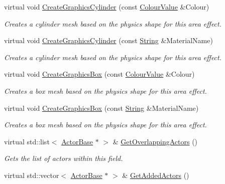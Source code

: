 \begin{DoxyCompactItemize}
virtual void \hyperlink{classphys_1_1AreaEffect_af9a44284ceb691fdd21e4fc01811f04d}{CreateGraphicsCylinder} (const \hyperlink{classphys_1_1ColourValue}{ColourValue} \&Colour)
\begin{DoxyCompactList}\small\item\em Creates a cylinder mesh based on the physics shape for this area effect. \item\end{DoxyCompactList}\item 
virtual void \hyperlink{classphys_1_1AreaEffect_a7ace0990c2e9282cfc91847fddeac3e0}{CreateGraphicsCylinder} (const \hyperlink{namespacephys_aa03900411993de7fbfec4789bc1d392e}{String} \&MaterialName)
\begin{DoxyCompactList}\small\item\em Creates a cylinder mesh based on the physics shape for this area effect. \item\end{DoxyCompactList}\item 
virtual void \hyperlink{classphys_1_1AreaEffect_a12655c60d5461ef6053c8bdd5cc9afea}{CreateGraphicsBox} (const \hyperlink{classphys_1_1ColourValue}{ColourValue} \&Colour)
\begin{DoxyCompactList}\small\item\em Creates a box mesh based on the physics shape for this area effect. \item\end{DoxyCompactList}\item 
virtual void \hyperlink{classphys_1_1AreaEffect_a169a8cba1c9aec84573788dff001fb31}{CreateGraphicsBox} (const \hyperlink{namespacephys_aa03900411993de7fbfec4789bc1d392e}{String} \&MaterialName)
\begin{DoxyCompactList}\small\item\em Creates a box mesh based on the physics shape for this area effect. \item\end{DoxyCompactList}\item 
virtual std::list$<$ \hyperlink{classphys_1_1ActorBase}{ActorBase} $\ast$ $>$ \& \hyperlink{classphys_1_1AreaEffect_ab995fec11d9e5fbae1851109067958db}{GetOverlappingActors} ()
\begin{DoxyCompactList}\small\item\em Gets the list of actors within this field. \item\end{DoxyCompactList}\item 
virtual std::vector$<$ \hyperlink{classphys_1_1ActorBase}{ActorBase} $\ast$ $>$ \& \hyperlink{classphys_1_1AreaEffect_a72a9673c926ce876df630c4aecfc09f6}{GetAddedActors} ()

\end{DoxyCompactItemize}
